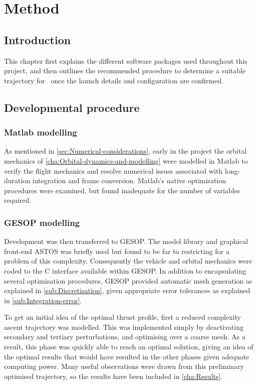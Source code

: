 \chapter{Method} \label{cha:Method}

\section{Introduction} \label{sec:Method-intro}

This chapter first explains the different software packages used throughout this project, and then outlines the recommended procedure to determine a suitable trajectory for \BW\ once the launch details and configuration are confirmed.

\section{Developmental procedure} \label{sec:Development}

\subsection{Matlab modelling} \label{sub:Matlab}

As mentioned in \autoref{sec:Numerical-considerations}, early in the project the orbital mechanics of \autoref{cha:Orbital-dynamics-and-modelling} were modelled in Matlab to verify the flight mechanics and resolve numerical issues associated with long-duration integration and frame conversion. Matlab's native optimisation procedures were examined, but found inadequate for the number of variables required.

\subsection{GESOP modelling} \label{sub:GESOP}

Development was then transferred to GESOP. The model library and graphical front-end ASTOS was briefly used but found to be far to restricting for a problem of this complexity. Consequently the vehicle and orbital mechanics were coded to the C interface available within GESOP. In addition to encapsulating several optimisation procedures, GESOP provided automatic mesh generation as explained in \autoref{sub:Discretisation}, given appropriate error tolerances as explained in \autoref{sub:Integration-error}.

To get an initial idea of the optimal thrust profile, first a reduced complexity ascent trajectory was modelled. This was implemented simply by deactivating secondary and tertiary perturbations, and optimising over a coarse mesh. As a result, this phase was quickly able to reach an optimal solution, giving an idea of the optimal results that would have resulted in the other phases given adequate computing power. Many useful observations were drawn from this preliminary optimised trajectory, so the results have been included in \autoref{cha:Results}.


